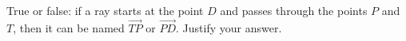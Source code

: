 True or false: if a ray starts at the point $D$ and passes through the points $P$ and $T$, then it can be named $\overrightarrow{TP}$ or $\overrightarrow{PD}$. Justify your answer.
